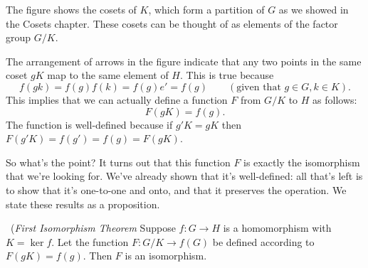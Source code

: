 The figure shows the cosets of $K$, which form a partition of $G$ as we showed in the Cosets chapter. These cosets can be thought of as elements of the factor group $G/K$. 

The arrangement of arrows in the figure indicate that any two points in the same coset $gK$ map to the same element of $H$.  
This is true because
\[ f(gk) = f(g)f(k) = f(g)e' = f(g)\qquad (\text{given that } g \in G, k \in K).\]
This implies that we can actually define a function $F$ from $G/K$ to $H$ as follows:
\[ F(gK) = f(g). \]
The function is well-defined because if $g'K = gK$ then $F(g'K) = f(g') = f(g) = F(gK)$.
 
So what's the point? It turns out that this function $F$ is exactly the isomorphism that we're looking for. We've already shown that it's well-defined: all that's left is to show that it's one-to-one and onto, and that it preserves the operation. We state these results as a proposition.

%  
%
%
%
%
% 
 
 
\begin{thmprop}~(\emph{First Isomorphism Theorem}\label{FirstIsoTheorem} 
Suppose $f : G \rightarrow H$ is a homomorphism with $K =\ker
f$. Let the function $F: G/K \rightarrow f(G)$
 be defined according to $F(gK) = f(g)$. Then $F$ is an isomorphism. 
\end{thmprop}
 
